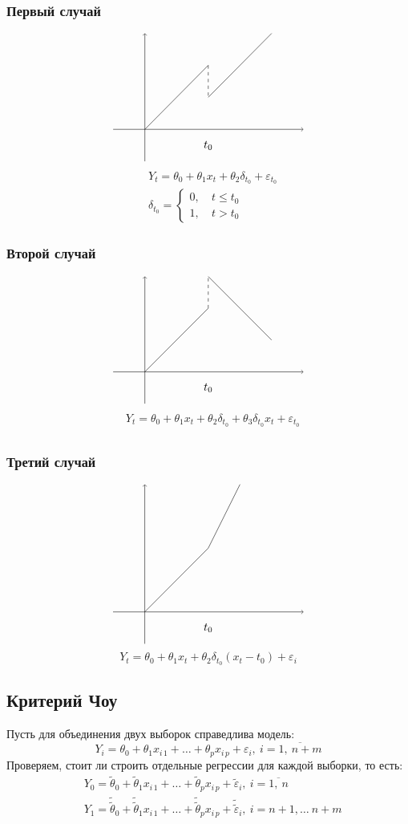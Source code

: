 \documentclass[12pt, a4paper]{article}
\begin{document}
\subsubsection*{Первый случай}
\[
\begin{tikzpicture}
    \draw[->] (-1, 0) -- (5, 0);
    \draw[->] (0, -1) -- (0, 3);
    \draw (0, 0) -- (2, 2);
    \draw[dashed] (2 , 2) -- (2, 1);
    \draw (2, 1) -- (4, 3);
    \node at (2, -0.5) (a) {$t_0$};
\end{tikzpicture}
\]
\[
\begin{aligned}
    & Y_t = \theta_0 + \theta_1 x_t + \theta_2 \delta_{t_0}  + \varepsilon_{t_0}\\
    & \delta_{t_0} = \begin{cases}
        0,\ & t \leq t_0\\
        1,\ & t > t_0
    \end{cases}
\end{aligned}
\]
\subsubsection*{Второй случай}
\[
\begin{tikzpicture}
    \draw[->] (-1, 0) -- (5, 0);
    \draw[->] (0, -1) -- (0, 3);
    \draw (0, 0) -- (2, 2);
    \draw[dashed] (2 , 2) -- (2, 3);
    \draw (2, 3) -- (4, 1);
    \node at (2, -0.5) (a) {$t_0$};
\end{tikzpicture}
\]
\[
\begin{aligned}
    & Y_t = \theta_0 + \theta_1 x_t + \theta_2 \delta_{t_0} + \theta_3 \delta_{t_0} x_t + \varepsilon_{t_0}\\
\end{aligned}
\]
\newpage
\subsubsection*{Третий случай}
\[
\begin{tikzpicture}
    \draw[->] (-1, 0) -- (5, 0);
    \draw[->] (0, -1) -- (0, 4);
    \draw (0, 0) -- (2, 2);
    \draw (2, 2) -- (3, 4);
    \node at (2, -0.5) (a) {$t_0$};
\end{tikzpicture}
\]
\[
Y_t = \theta_0 + \theta_1 x_t + \theta_2 \delta_{t_0}(x_t - t_0) + \varepsilon_i
\]
\subsection*{Критерий Чоу}
Пусть для объединения двух выборок справедлива модель:
\[
Y_i = \theta_0 + \theta_1 x_{i\, 1} + \dots + \theta_p x_{i\, p} + \varepsilon_i,\ i = \overline{1,\ n + m}
\]
Проверяем, стоит ли строить отдельные регрессии для каждой выборки, то есть:
\[
\begin{aligned}
    & Y_0 = \tilde \theta_0 + \tilde \theta_1 x_{i\, 1} + \dots + \tilde \theta_p x_{i\, p} + \tilde \varepsilon_i,\ i = \overline{1,\ n}\\
    & Y_1 = \tilde{\tilde \theta}_0 + \tilde{\tilde \theta}_1 x_{i\, 1} + \dots + \tilde{\tilde \theta}_p x_{i\, p} + \tilde{\tilde \varepsilon}_i,\ i = n + 1,\dots\ n + m
\end{aligned}
\]
\end{document}
